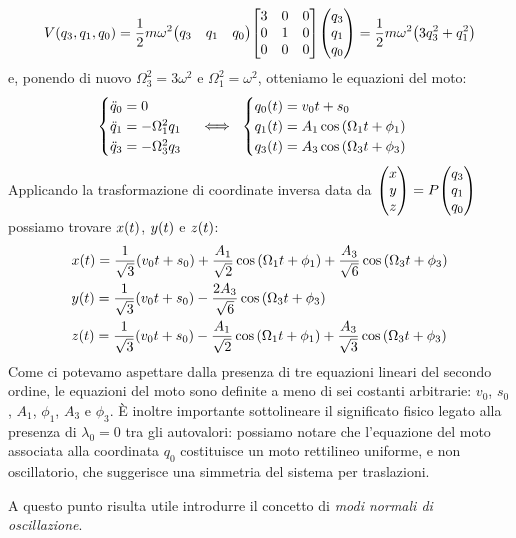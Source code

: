             $$V(q_3,q_1,q_0)=\frac{1}{2}m\omega^2\mqty(q_3 & q_1 & q_0)\mqty[\dmat[0]{3,1,0}]\mqty(q_3 \\ q_1 \\ q_0)=\frac{1}{2}m\omega^2\qty(3q_3^2+q_1^2)$$
        e, ponendo di nuovo $\Omega_3^2=3\omega^2$ e $\Omega_1^2=\omega^2$, otteniamo le equazioni del moto:
        \begin{equation*}
        \begin{cases}
            \ddot{q}_0=0\\
            \ddot{q}_1=-\Omega_1^2q_1\\
            \ddot{q}_3=-\Omega_3^2q_3
        \end{cases}
        \iff\
        \begin{cases}
            q_0\qty(t)=v_0t+s_0\\
            q_1\qty(t)=A_1\cos\qty(\Omega_1 t+\phi_1)\\
            q_3\qty(t)=A_3\cos\qty(\Omega_3 t+\phi_3)
        \end{cases}
        \end{equation*}
        Applicando la trasformazione di coordinate inversa data da $\mqty(x \\ y \\ z)=P\mqty(q_3 \\ q_1 \\ q_0)$ possiamo trovare $x\qty(t)$, $y\qty(t)$ e $z\qty(t)$:
        \begin{align*}
            &x\qty(t)=\frac{1}{\sqrt{3}}\qty(v_0t+s_0)+\frac{A_1}{\sqrt{2}}\cos\qty(\Omega_1t+\phi_1)+\frac{A_3}{\sqrt{6}}\cos\qty(\Omega_3t+\phi_3)\\
            &y\qty(t)=\frac{1}{\sqrt{3}}\qty(v_0t+s_0)-\frac{2A_3}{\sqrt{6}}\cos\qty(\Omega_3t+\phi_3)\\
            &z\qty(t)=\frac{1}{\sqrt{3}}\qty(v_0t+s_0)-\frac{A_1}{\sqrt{2}}\cos\qty(\Omega_1t+\phi_1)+\frac{A_3}{\sqrt{3}}\cos\qty(\Omega_3t+\phi_3)
        \end{align*}
        Come ci potevamo aspettare dalla presenza di tre equazioni lineari del secondo ordine, le equazioni del moto sono definite a meno di sei costanti arbitrarie: $v_0$, $s_0$, $A_1$, $\phi_1$, $A_3$ e $\phi_3$. \`E inoltre importante sottolineare il significato fisico legato alla presenza di $\lambda_0=0$ tra gli autovalori: possiamo notare che l'equazione del moto associata alla coordinata $q_0$ costituisce un moto rettilineo uniforme, e non oscillatorio, che suggerisce una simmetria del sistema per traslazioni.
        \par A questo punto risulta utile introdurre il concetto di \emph{modi normali di oscillazione}.
